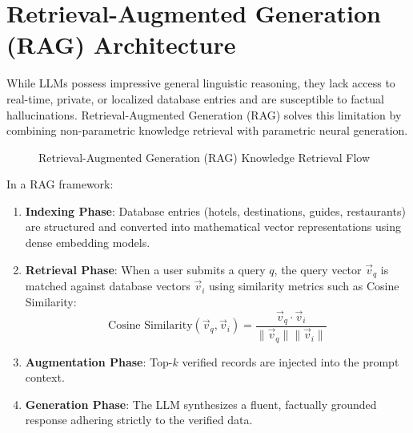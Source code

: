 \documentclass[12pt,a4paper]{report}
\begin{document}
\section{Retrieval-Augmented Generation (RAG) Architecture}
While LLMs possess impressive general linguistic reasoning, they lack access to real-time, private, or localized database entries and are susceptible to factual hallucinations. Retrieval-Augmented Generation (RAG) solves this limitation by combining non-parametric knowledge retrieval with parametric neural generation.

\begin{figure}[htbp]
\centering
{}
\caption{Retrieval-Augmented Generation (RAG) Knowledge Retrieval Flow}
\label{fig:rag_detailed_theory}
\end{figure}

In a RAG framework:
\begin{enumerate}
    \item \textbf{Indexing Phase}: Database entries (hotels, destinations, guides, restaurants) are structured and converted into mathematical vector representations using dense embedding models.
    \item \textbf{Retrieval Phase}: When a user submits a query $q$, the query vector $\vec{v}_q$ is matched against database vectors $\vec{v}_i$ using similarity metrics such as Cosine Similarity:
    \begin{equation}
        \text{Cosine Similarity}(\vec{v}_q, \vec{v}_i) = \frac{\vec{v}_q \cdot \vec{v}_i}{\|\vec{v}_q\| \|\vec{v}_i\|}
    \end{equation}
    \item \textbf{Augmentation Phase}: Top-$k$ verified records are injected into the prompt context.
    \item \textbf{Generation Phase}: The LLM synthesizes a fluent, factually grounded response adhering strictly to the verified data.
\end{enumerate}
\end{document}
